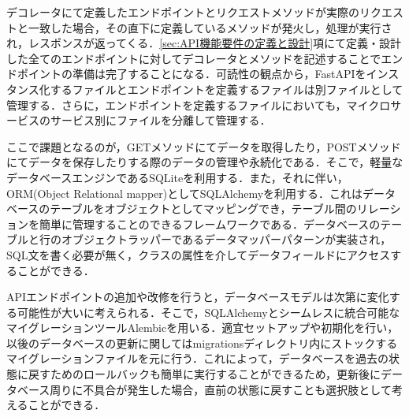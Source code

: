           \par デコレータにて定義したエンドポイントとリクエストメソッドが実際のリクエストと一致した場合，その直下に定義しているメソッドが発火し，処理が実行され，レスポンスが返ってくる．\ref{sec:API機能要件の定義と設計}項にて定義・設計した全てのエンドポイントに対してデコレータとメソッドを記述することでエンドポイントの準備は完了することになる．可読性の観点から，FastAPIをインスタンス化するファイルとエンドポイントを定義するファイルは別ファイルとして管理する．さらに，エンドポイントを定義するファイルにおいても，マイクロサービスのサービス別にファイルを分離して管理する．
          \par ここで課題となるのが，GETメソッドにてデータを取得したり，POSTメソッドにてデータを保存したりする際のデータの管理や永続化である．そこで，軽量なデータベースエンジンであるSQLiteを利用する．また，それに伴い，ORM(Object Relational mapper)としてSQLAlchemyを利用する．これはデータベースのテーブルをオブジェクトとしてマッピングでき，テーブル間のリレーションを簡単に管理することのできるフレームワークである．データベースのテーブルと行のオブジェクトラッパーであるデータマッパーパターンが実装され，SQL文を書く必要が無く，クラスの属性を介してデータフィールドにアクセスすることができる．
          \par APIエンドポイントの追加や改修を行うと，データベースモデルは次第に変化する可能性が大いに考えられる．そこで，SQLAlchemyとシームレスに統合可能なマイグレーションツールAlembicを用いる．適宜セットアップや初期化を行い，以後のデータベースの更新に関してはmigrationsディレクトリ内にストックするマイグレーションファイルを元に行う．これによって，データベースを過去の状態に戻すためのロールバックも簡単に実行することができるため，更新後にデータベース周りに不具合が発生した場合，直前の状態に戻すことも選択肢として考えることができる．
          

